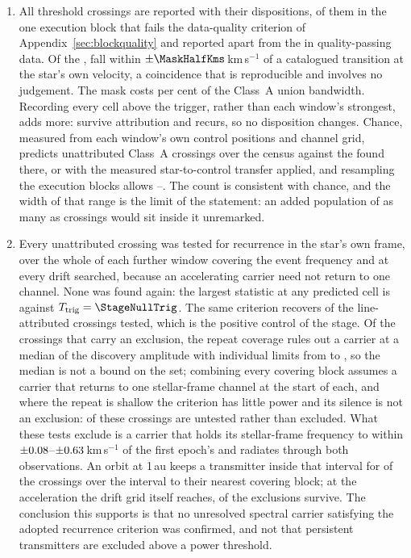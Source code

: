 \begin{enumerate}[leftmargin=1.6em,itemsep=4pt,topsep=4pt,parsep=0pt]
\item All \EvNCrossRaw{} threshold crossings are reported with their
dispositions, \PrFlagXrossWord{} of them in the one execution block that
fails the data-quality criterion of Appendix~\ref{sec:blockquality} and
reported apart from the \EvNCrossQp{} in quality-passing data. Of the
\EvNCrossRaw, \MkNCoinc{} fall within $\pm\MaskHalfKms$\,km\,s$^{-1}$ of a
catalogued transition at the star's own velocity, a coincidence that is
reproducible and involves no judgement. The mask costs
\MkMaskAPct{} per cent of the Class~A union bandwidth. Recording every cell
above the trigger, rather than each window's strongest, adds \CkNSecondary{}
more: \CkNSecUnattrWord{} survive attribution and \CkNRecurWord{} recurs, so
no disposition changes. Chance,
measured from each window's own control positions and channel grid, predicts
\CeExp{} unattributed Class~A crossings over the census against the \CeObs{}
found there, or \CeExpX{} with the measured star-to-control transfer applied,
and resampling the execution blocks allows \CeLo--\CeHi. The count is
consistent with chance, and the width of that range is the limit of the
statement: an added population of as many as \CeAddBlind{} crossings would
sit inside it unremarked.

\item Every unattributed crossing was tested for recurrence in the star's
own frame, over the whole of each further window covering the event frequency
and at every drift searched, because an accelerating carrier need not return
to one channel. None was found again: the largest statistic at any predicted
cell is \RcTMax{} against $T_{\rm trig}=\StageNullTrig$. The same criterion
recovers \MkAttrRecur{} of the \MkAttrTested{} line-attributed crossings
tested, which is the positive control of the stage.
Of the \RcNExcl{} crossings
that carry an exclusion, the repeat coverage rules out a carrier at a median
\RcFracMed{} of the discovery amplitude with individual limits from
\RcFracMin{} to \RcFracMax, so the median is not a bound on the set;
combining every covering block assumes a carrier that returns to one
stellar-frame channel at the start of each, and where the repeat is shallow
the criterion has little power and its silence is not an exclusion:
\RcNPowerLo{} of these crossings are untested rather than excluded. What
these tests exclude is a carrier that holds its stellar-frame frequency to
within $\pm0.08$--$\pm0.63$\,km\,s$^{-1}$ of the first epoch's and
radiates through both observations. An orbit at 1\,au keeps a transmitter
inside that interval for \RqNOrbNear{} of the \RqNUnit{} crossings over the
interval to their nearest covering block; at the acceleration the drift grid
itself reaches, \RqOrbGridWord{} of the exclusions survive. The conclusion
this supports is that no unresolved spectral carrier satisfying the adopted
recurrence criterion was confirmed, and not that persistent transmitters are
excluded above a power threshold.


\end{enumerate}
